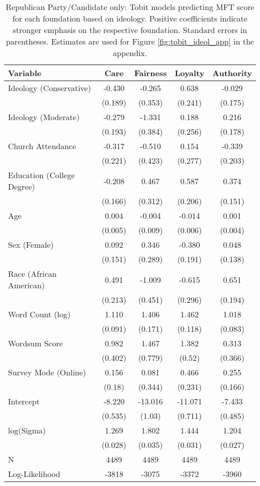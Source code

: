 \begin{table}[ht]
\centering
\caption{Republican Party/Candidate only: Tobit models predicting MFT score for each foundation based 
           on ideology. Positive coefficients indicate stronger emphasis on the respective 
           foundation. Standard errors in parentheses. Estimates are used for  
           Figure \ref{fig:tobit_ideol_app} in the appendix.} 
\label{tab:tobit_rep}
\begingroup\footnotesize
\begin{tabular}{lcccc}
  \hline
Variable & Care & Fairness & Loyalty & Authority \\ 
  \hline
Ideology (Conservative) & -0.430 &  -0.265 &   0.638 & -0.029 \\ 
   & (0.189) & (0.353) & (0.241) & (0.175) \\ 
  Ideology (Moderate) & -0.279 &  -1.331 &   0.188 &  0.216 \\ 
   & (0.193) & (0.384) & (0.256) & (0.178) \\ 
  Church Attendance & -0.317 &  -0.510 &   0.154 & -0.339 \\ 
   & (0.221) & (0.423) & (0.277) & (0.203) \\ 
  Education (College Degree) & -0.208 &   0.467 &   0.587 &  0.374 \\ 
   & (0.166) & (0.312) & (0.206) & (0.151) \\ 
  Age &  0.004 &  -0.004 &  -0.014 &  0.001 \\ 
   & (0.005) & (0.009) & (0.006) & (0.004) \\ 
  Sex (Female) &  0.092 &   0.346 &  -0.380 &  0.048 \\ 
   & (0.151) & (0.289) & (0.191) & (0.138) \\ 
  Race (African American) &  0.491 &  -1.009 &  -0.615 &  0.651 \\ 
   & (0.213) & (0.451) & (0.296) & (0.194) \\ 
  Word Count (log) &  1.110 &   1.406 &   1.462 &  1.018 \\ 
   & (0.091) & (0.171) & (0.118) & (0.083) \\ 
  Wordsum Score &  0.982 &   1.467 &   1.382 &  0.313 \\ 
   & (0.402) & (0.779) & (0.52) & (0.366) \\ 
  Survey Mode (Online) &  0.156 &   0.081 &   0.466 &  0.255 \\ 
   & (0.18) & (0.344) & (0.231) & (0.166) \\ 
  Intercept & -8.220 & -13.016 & -11.071 & -7.433 \\ 
   & (0.535) & (1.03) & (0.711) & (0.485) \\ 
  log(Sigma) &  1.269 &   1.802 &   1.444 &  1.204 \\ 
   & (0.028) & (0.035) & (0.031) & (0.027) \\ 
   \hline
N & 4489 & 4489 & 4489 & 4489 \\ 
  Log-Likelihood & -3818 & -3075 & -3372 & -3960 \\ 
   \hline
\end{tabular}
\endgroup
\end{table}
